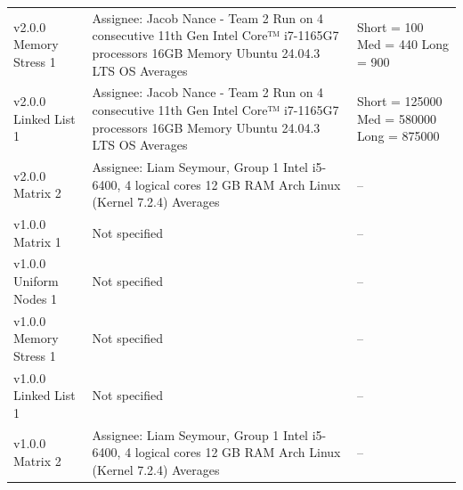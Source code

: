 \begin{longtable}{>{\raggedright\arraybackslash}p{}>{\raggedright\arraybackslash}p{}>{\raggedright\arraybackslash}p{}}
v2.0.0 \textbar{} Memory Stress \textbar{} 1 & Assignee: \textbar{}  Jacob Nance - Team 2 \textbar{}  Run on 4 consecutive 11th Gen Intel Core™ i7-1165G7  processors \textbar{}  16GB Memory \textbar{}  Ubuntu 24.04.3 LTS  OS \textbar{}  Averages & Short = 100 \textbar{}  Med = 440 \textbar{}  Long = 900 \\
v2.0.0 \textbar{} Linked List \textbar{} 1 & Assignee: \textbar{}  Jacob Nance - Team 2 \textbar{}  Run on 4 consecutive 11th Gen Intel Core™ i7-1165G7  processors \textbar{}  16GB Memory \textbar{}  Ubuntu 24.04.3 LTS  OS \textbar{}  Averages & Short = 125000 \textbar{}  Med = 580000 \textbar{}  Long = 875000 \\
v2.0.0 \textbar{} Matrix \textbar{} 2 & Assignee: \textbar{}  Liam Seymour, Group 1 \textbar{}  Intel i5-6400, 4 logical cores \textbar{}  12 GB RAM \textbar{}  Arch Linux (Kernel 7.2.4) \textbar{}  Averages & -- \\
v1.0.0 \textbar{} Matrix \textbar{} 1 & Not specified & -- \\
v1.0.0 \textbar{} Uniform Nodes \textbar{} 1 & Not specified & -- \\
v1.0.0 \textbar{} Memory Stress \textbar{} 1 & Not specified & -- \\
v1.0.0 \textbar{} Linked List \textbar{} 1 & Not specified & -- \\
v1.0.0 \textbar{} Matrix \textbar{} 2 & Assignee: \textbar{}  Liam Seymour, Group 1 \textbar{}  Intel i5-6400, 4 logical cores \textbar{}  12 GB RAM \textbar{}  Arch Linux (Kernel 7.2.4) \textbar{}  Averages & -- \\
\end{longtable}


